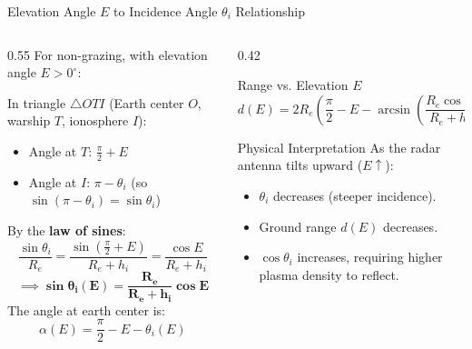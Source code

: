 \documentclass[aspectratio=169, 10pt]{beamer}
\begin{document}
\begin{frame}{Elevation Angle $E$ to Incidence Angle $\theta_i$ Relationship}
    \begin{columns}[c]
        \begin{column}{0.55\textwidth}
            For non-grazing, with elevation angle $E > 0^\circ$:
            
            \vspace{0.1cm}
            In triangle $\triangle O T I$ (Earth center $O$, warship $T$, ionosphere $I$):
            \begin{itemize}
                \item Angle at $T$: $\frac{\pi}{2} + E$
                \item Angle at $I$: $\pi - \theta_i$ (so $\sin(\pi - \theta_i) = \sin\theta_i$)
            \end{itemize}
            By the \textbf{law of sines}:
            \begin{equation}
                \frac{\sin\theta_i}{R_e} = \frac{\sin\left(\frac{\pi}{2} + E\right)}{R_e + h_i} = \frac{\cos E}{R_e + h_i}
            \end{equation}
            \begin{equation}
                \implies \mathbf{\sin\theta_i(E) = \frac{R_e}{R_e + h_i} \cos E}
            \end{equation}
            The angle at earth center is:
            \begin{equation}
                \alpha(E) = \frac{\pi}{2} - E - \theta_i(E)
            \end{equation}
        \end{column}
        \begin{column}{0.42\textwidth}
            \begin{block}{Range vs. Elevation $E$}
                \begin{equation}
                    d(E) = 2 R_e \left(\frac{\pi}{2} - E - \arcsin\left(\frac{R_e\cos E}{R_e + h_i}\right)\right)
                \end{equation}
            \end{block}
            \begin{alertblock}{Physical Interpretation}
                As the radar antenna tilts upward ($E \uparrow$):
                \begin{itemize}
                    \item $\theta_i$ decreases (steeper incidence).
                    \item Ground range $d(E)$ decreases.
                    \item $\cos\theta_i$ increases, requiring higher plasma density to reflect.
                \end{itemize}
            \end{alertblock}
        \end{column}
    \end{columns}
\end{frame}
\end{document}

